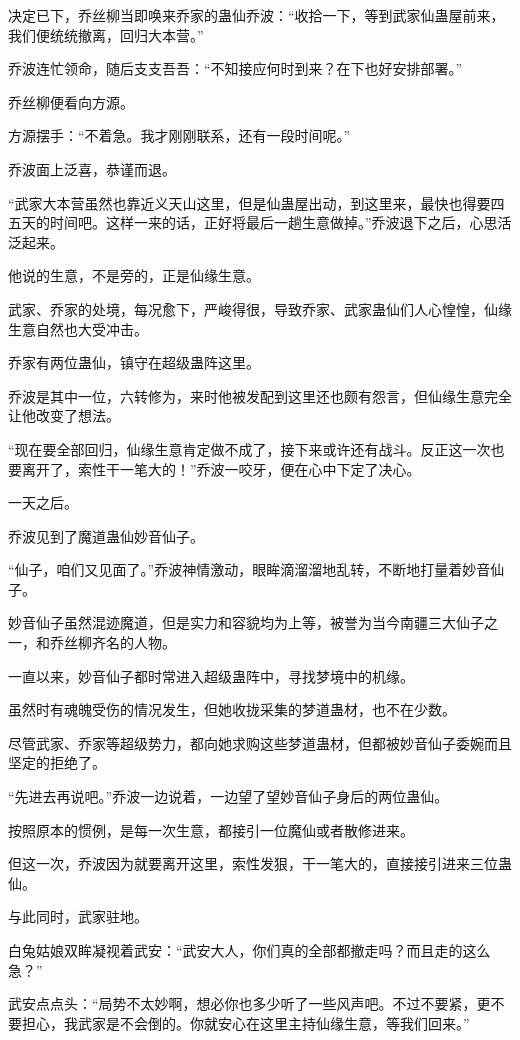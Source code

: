 \begin{this_body}
决定已下，乔丝柳当即唤来乔家的蛊仙乔波：“收拾一下，等到武家仙蛊屋前来，我们便统统撤离，回归大本营。”

乔波连忙领命，随后支支吾吾：“不知接应何时到来？在下也好安排部署。”

乔丝柳便看向方源。

方源摆手：“不着急。我才刚刚联系，还有一段时间呢。”

乔波面上泛喜，恭谨而退。

“武家大本营虽然也靠近义天山这里，但是仙蛊屋出动，到这里来，最快也得要四五天的时间吧。这样一来的话，正好将最后一趟生意做掉。”乔波退下之后，心思活泛起来。

他说的生意，不是旁的，正是仙缘生意。

武家、乔家的处境，每况愈下，严峻得很，导致乔家、武家蛊仙们人心惶惶，仙缘生意自然也大受冲击。

乔家有两位蛊仙，镇守在超级蛊阵这里。

乔波是其中一位，六转修为，来时他被发配到这里还也颇有怨言，但仙缘生意完全让他改变了想法。

“现在要全部回归，仙缘生意肯定做不成了，接下来或许还有战斗。反正这一次也要离开了，索性干一笔大的！”乔波一咬牙，便在心中下定了决心。

一天之后。

乔波见到了魔道蛊仙妙音仙子。

“仙子，咱们又见面了。”乔波神情激动，眼眸滴溜溜地乱转，不断地打量着妙音仙子。

妙音仙子虽然混迹魔道，但是实力和容貌均为上等，被誉为当今南疆三大仙子之一，和乔丝柳齐名的人物。

一直以来，妙音仙子都时常进入超级蛊阵中，寻找梦境中的机缘。

虽然时有魂魄受伤的情况发生，但她收拢采集的梦道蛊材，也不在少数。

尽管武家、乔家等超级势力，都向她求购这些梦道蛊材，但都被妙音仙子委婉而且坚定的拒绝了。

“先进去再说吧。”乔波一边说着，一边望了望妙音仙子身后的两位蛊仙。

按照原本的惯例，是每一次生意，都接引一位魔仙或者散修进来。

但这一次，乔波因为就要离开这里，索性发狠，干一笔大的，直接接引进来三位蛊仙。

与此同时，武家驻地。

白兔姑娘双眸凝视着武安：“武安大人，你们真的全部都撤走吗？而且走的这么急？”

武安点点头：“局势不太妙啊，想必你也多少听了一些风声吧。不过不要紧，更不要担心，我武家是不会倒的。你就安心在这里主持仙缘生意，等我们回来。”


\end{this_body}
